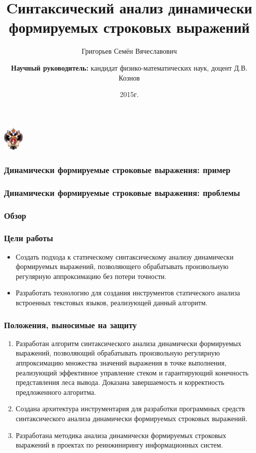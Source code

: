 \documentclass{beamer}
\title[]{Cинтаксический анализ динамически формируемых строковых выражений}
\institute[СПбГУ]{
Санкт-Петербургский государственный университет \\
Математико-Механический факультет \\
Кафедра системного программирования }
\author[Семён]{Григорьев Семён Вячеславович \\
  \and  
  {\bfseries Научный руководитель:} кандидат физико-математических наук, доцент Д.В. Кознов \\ 
}
\date{2015г.}
\begin{document}
{

\begin{frame}
\begin{center}
{\includegraphics[width=1cm]{SPbGU_Logo.png}}
\end{center}
\titlepage
\end{frame}
}

\begin{frame}
	\transwipe[direction=90]
	\frametitle{Динамически формируемые строковые выражения: пример}
\end{frame}

\begin{frame}
	\transwipe[direction=90]
	\frametitle{Динамически формируемые строковые выражения: проблемы}
\end{frame}

\begin{frame}
	\transwipe[direction=90]
	\frametitle{Обзор}
\end{frame}

\begin{frame}
	\transwipe[direction=90]
	\frametitle{Цели работы}
	\begin{itemize}
		\item Создать подхода к статическому синтаксическому анализу динамически формируемых выражений, позволяющего обрабатывать произвольную регулярную аппроксимацию без потери точности.
	        \item Разработать технологию для создания инструментов статического анализа встроенных текстовых языков, реализующей данный алгоритм.
	\end{itemize}
\end{frame}

\begin{frame}
	\transwipe[direction=90]
	\frametitle{Положения, выносимые на защиту}
        \begin{enumerate}
            \item Разработан алгоритм синтаксического анализа динамически формируемых выражений, позволяющий обрабатывать произвольную регулярную аппроксимацию множества значений выражения в точке выполнения, реализующий эффективное управление стеком и гарантирующий конечность представления леса вывода. Доказана завершаемость и корректность предложенного алгоритма.
            \item Создана архитектура инструментария для разработки программных средств синтаксического анализа динамически формируемых строковых выражений.
            \item Разработана методика анализа динамически формируемых строковых выражений в проектах по реинжинирингу информационных систем.  
\end{enumerate}
\end{frame}
\end{document}
